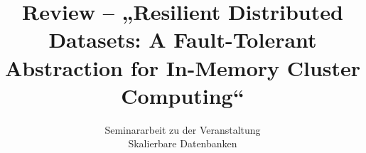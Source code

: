\title{Review -- „Resilient Distributed Datasets: A Fault-Tolerant Abstraction for In-Memory Cluster Computing“ }
\subtitle{Seminararbeit zu der Veranstaltung \\Skalierbare Datenbanken}

